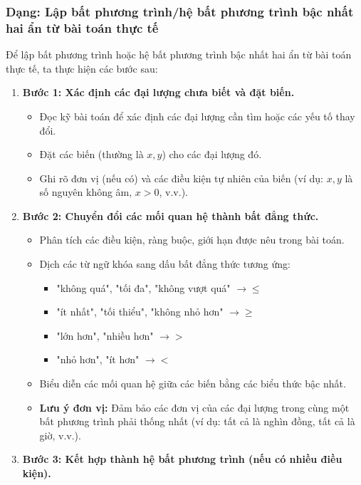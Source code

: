 \subsubsection{Dạng: Lập bất phương trình/hệ bất phương trình bậc nhất hai ẩn từ bài toán thực tế}
\begin{phuongphap}
Để lập bất phương trình hoặc hệ bất phương trình bậc nhất hai ẩn từ bài toán thực tế, ta thực hiện các bước sau:
\begin{enumerate}
    \item \textbf{Bước 1: Xác định các đại lượng chưa biết và đặt biến.}
    \begin{itemize}
        \item Đọc kỹ bài toán để xác định các đại lượng cần tìm hoặc các yếu tố thay đổi.
        \item Đặt các biến (thường là $x, y$) cho các đại lượng đó.
        \item Ghi rõ đơn vị (nếu có) và các điều kiện tự nhiên của biến (ví dụ: $x, y$ là số nguyên không âm, $x > 0$, v.v.).
    \end{itemize}
    \item \textbf{Bước 2: Chuyển đổi các mối quan hệ thành bất đẳng thức.}
    \begin{itemize}
        \item Phân tích các điều kiện, ràng buộc, giới hạn được nêu trong bài toán.
        \item Dịch các từ ngữ khóa sang dấu bất đẳng thức tương ứng:
        \begin{itemize}
            \item "không quá", "tối đa", "không vượt quá" $\rightarrow \le$
            \item "ít nhất", "tối thiểu", "không nhỏ hơn" $\rightarrow \ge$
            \item "lớn hơn", "nhiều hơn" $\rightarrow >$
            \item "nhỏ hơn", "ít hơn" $\rightarrow <$
        \end{itemize}
        \item Biểu diễn các mối quan hệ giữa các biến bằng các biểu thức bậc nhất.
        \item \textbf{Lưu ý đơn vị:} Đảm bảo các đơn vị của các đại lượng trong cùng một bất phương trình phải thống nhất (ví dụ: tất cả là nghìn đồng, tất cả là giờ, v.v.).
    \end{itemize}
    \item \textbf{Bước 3: Kết hợp thành hệ bất phương trình (nếu có nhiều điều kiện).}

\end{enumerate}
\end{phuongphap}
